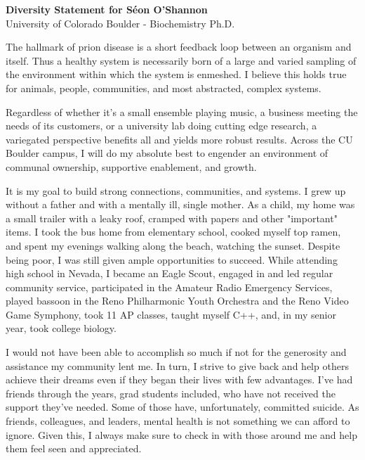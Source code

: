 \documentclass[12pt]{article}
\begin{document}
\begin{center}
    \Large{\textbf{Diversity Statement for Séon O'Shannon}} \\
    University of Colorado Boulder - Biochemistry Ph.D.
\end{center}

\vspace{0.1cm}

The hallmark of prion disease is a short feedback loop between an organism and itself. Thus a healthy system is necessarily born of a large and varied sampling of the environment within which the system is enmeshed. I believe this holds true for animals, people, communities, and most abstracted, complex systems.

Regardless of whether it's a small ensemble playing music, a business meeting the needs of its customers, or a university lab doing cutting edge research, a variegated perspective benefits all and yields more robust results. Across the CU Boulder campus, I will do my absolute best to engender an environment of communal ownership, supportive enablement, and growth.

It is my goal to build strong connections, communities, and systems. I grew up without a father and with a mentally ill, single mother. As a child, my home was a small trailer with a leaky roof, cramped with papers and other "important" items. I took the bus home from elementary school, cooked myself top ramen, and spent my evenings walking along the beach, watching the sunset. Despite being poor, I was still given ample opportunities to succeed. While attending high school in Nevada, I became an Eagle Scout, engaged in and led regular community service, participated in the Amateur Radio Emergency Services, played bassoon in the Reno Philharmonic Youth Orchestra and the Reno Video Game Symphony, took 11 AP classes, taught myself C++, and, in my senior year, took college biology.

I would not have been able to accomplish so much if not for the generosity and assistance my community lent me. In turn, I strive to give back and help others achieve their dreams even if they began their lives with few advantages. I've had friends through the years, grad students included, who have not received the support they've needed. Some of those have, unfortunately, committed suicide. As friends, colleagues, and leaders, mental health is not something we can afford to ignore. Given this, I always make sure to check in with those around me and help them feel seen and appreciated.
\end{document}
